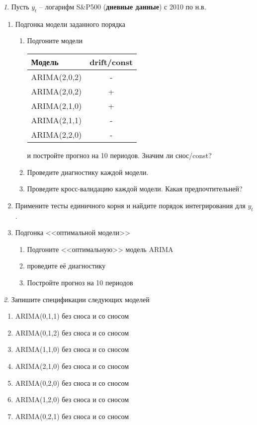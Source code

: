 \documentclass[12pt]{article}
\theoremstyle{remark}
\newtheorem{exercise}{}[subsection]
\begin{document}
\begin{exercise}
Пусть \(y_t\) -- логарифм S\&P500 (\textbf{дневные данные}) с 2010 по н.в.
\begin{enumerate}
	\item Подгонка модели заданного порядка
		\begin{enumerate}
			\item Подгоните модели
			\begin{center}
			\begin{tabular}{l|c}
				Модель & drift/const \\ \hline
				ARIMA(2,0,2) & - \\
				ARIMA(2,0,2) & + \\
				ARIMA(2,1,0) & + \\
				ARIMA(2,1,1) & - \\
				ARIMA(2,2,0) & - \\ \hline
			\end{tabular}
			\end{center} 
			и постройте прогноз на 10 периодов. Значим ли снос/const?
			\item Проведите диагностику каждой модели.
			\item Проведите кросс-валидацию каждой модели. Какая предпочтительней?
		\end{enumerate}
		\item Примените тесты единичного корня и найдите порядок интегрирования для \(y_t\). 
		\item Подгонка <<оптимальной модели>>
		\begin{enumerate}
			\item Подгоните <<оптимальную>> модель ARIMA
			\item проведите её диагностику
			\item Постройте прогноз на 10 периодов
		\end{enumerate}
	\end{enumerate}
	\end{exercise}

\begin{exercise}
Запишите спецификации следующих моделей
\begin{enumerate}
	\item ARIMA(0,1,1) без сноса и со сносом
	\item ARIMA(0,1,2) без сноса и со сносом
	\item ARIMA(1,1,0) без сноса и со сносом
	\item ARIMA(2,1,0) без сноса и со сносом
	\item ARIMA(0,2,0) без сноса и со сносом
	\item ARIMA(1,2,0) без сноса и со сносом
	\item ARIMA(0,2,1) без сноса и со сносом
\end{enumerate}
\end{exercise}
\end{document}
